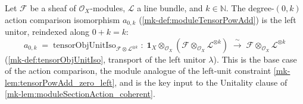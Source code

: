 \begin{lemma}\label{mk-lem:moduleTensorPowAdd_zero_left}
  \leanok

  Let \(\mathcal{F}\) be a sheaf of \(\mathcal{O}_X\)-modules, \(\mathcal{L}\) a line
  bundle, and \(k \in \mathbb{N}\). The degree-\((0,k)\) action comparison
  isomorphism \(a_{0,k}\) (\ref{mk-def:moduleTensorPowAdd}) is the left unitor,
  reindexed along \(0 + k = k\):
  \[
    a_{0,k} \;=\;
      \mathrm{tensorObjUnitIso}_{\mathcal{F}\otimes\mathcal{L}^{\otimes k}}
      \;:\; \mathbf{1}_X \otimes_{\mathcal{O}_X}
        (\mathcal{F}\otimes_{\mathcal{O}_X}\mathcal{L}^{\otimes k})
      \;\xrightarrow{\ \sim\ }\;
      \mathcal{F}\otimes_{\mathcal{O}_X}\mathcal{L}^{\otimes k}
  \]
  (\ref{mk-def:tensorObjUnitIso}, transport of the left unitor \(\lambda\)). This is
  the base case of the action comparison, the module analogue of the left-unit
  constraint \ref{mk-lem:tensorPowAdd_zero_left}, and is the key input to the
  Unitality clause of \ref{mk-lem:moduleSectionAction_coherent}.
\end{lemma}

